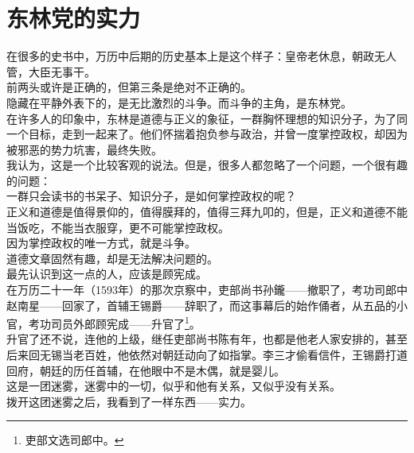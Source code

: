 \section{东林党的实力}
\ifnum{}
	\begin{multicols}{\theparacolNo}
\fi
在很多的史书中，万历中后期的历史基本上是这个样子：皇帝老休息，朝政无人管，大臣无事干。\\

前两头或许是正确的，但第三条是绝对不正确的。\\

隐藏在平静外表下的，是无比激烈的斗争。而斗争的主角，是东林党。\\

在许多人的印象中，东林是道德与正义的象征，一群胸怀理想的知识分子，为了同一个目标，走到一起来了。他们怀揣着抱负参与政治，并曾一度掌控政权，却因为被邪恶的势力坑害，最终失败。\\

我认为，这是一个比较客观的说法。但是，很多人都忽略了一个问题，一个很有趣的问题：\\

一群只会读书的书呆子、知识分子，是如何掌控政权的呢？\\

正义和道德是值得景仰的，值得膜拜的，值得三拜九叩的，但是，正义和道德不能当饭吃，不能当衣服穿，更不可能掌控政权。\\

因为掌控政权的唯一方式，就是斗争。\\

道德文章固然有趣，却是无法解决问题的。\\

最先认识到这一点的人，应该是顾宪成。\\

在万历二十一年（1593年）的那次京察中，吏部尚书孙鑨——撤职了，考功司郎中赵南星——回家了，首辅王锡爵——辞职了，而这事幕后的始作俑者，从五品的小官，考功司员外郎顾宪成——升官了\footnote{吏部文选司郎中。}。\\

升官了还不说，连他的上级，继任吏部尚书陈有年，也都是他老人家安排的，甚至后来回无锡当老百姓，他依然对朝廷动向了如指掌。李三才偷看信件，王锡爵打道回府，朝廷的历任首辅，在他眼中不是木偶，就是婴儿。\\

这是一团迷雾，迷雾中的一切，似乎和他有关系，又似乎没有关系。\\

拨开这团迷雾之后，我看到了一样东西——实力。\\


\end{multicols}
